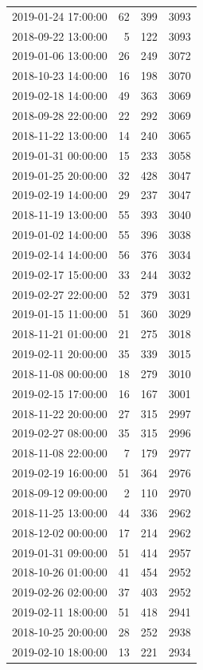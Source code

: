 \begin{tabular}{lrrr}
2019-01-24 17:00:00 & 62 & 399 & 3093 \\
2018-09-22 13:00:00 & 5 & 122 & 3093 \\
2019-01-06 13:00:00 & 26 & 249 & 3072 \\
2018-10-23 14:00:00 & 16 & 198 & 3070 \\
2019-02-18 14:00:00 & 49 & 363 & 3069 \\
2018-09-28 22:00:00 & 22 & 292 & 3069 \\
2018-11-22 13:00:00 & 14 & 240 & 3065 \\
2019-01-31 00:00:00 & 15 & 233 & 3058 \\
2019-01-25 20:00:00 & 32 & 428 & 3047 \\
2019-02-19 14:00:00 & 29 & 237 & 3047 \\
2018-11-19 13:00:00 & 55 & 393 & 3040 \\
2019-01-02 14:00:00 & 55 & 396 & 3038 \\
2019-02-14 14:00:00 & 56 & 376 & 3034 \\
2019-02-17 15:00:00 & 33 & 244 & 3032 \\
2019-02-27 22:00:00 & 52 & 379 & 3031 \\
2019-01-15 11:00:00 & 51 & 360 & 3029 \\
2018-11-21 01:00:00 & 21 & 275 & 3018 \\
2019-02-11 20:00:00 & 35 & 339 & 3015 \\
2018-11-08 00:00:00 & 18 & 279 & 3010 \\
2019-02-15 17:00:00 & 16 & 167 & 3001 \\
2018-11-22 20:00:00 & 27 & 315 & 2997 \\
2019-02-27 08:00:00 & 35 & 315 & 2996 \\
2018-11-08 22:00:00 & 7 & 179 & 2977 \\
2019-02-19 16:00:00 & 51 & 364 & 2976 \\
2018-09-12 09:00:00 & 2 & 110 & 2970 \\
2018-11-25 13:00:00 & 44 & 336 & 2962 \\
2018-12-02 00:00:00 & 17 & 214 & 2962 \\
2019-01-31 09:00:00 & 51 & 414 & 2957 \\
2018-10-26 01:00:00 & 41 & 454 & 2952 \\
2019-02-26 02:00:00 & 37 & 403 & 2952 \\
2019-02-11 18:00:00 & 51 & 418 & 2941 \\
2018-10-25 20:00:00 & 28 & 252 & 2938 \\
2019-02-10 18:00:00 & 13 & 221 & 2934 \\

\end{tabular}
